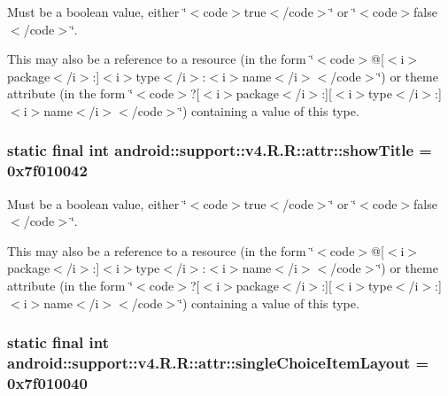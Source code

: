 Must be a boolean value, either \char`\"{}$<$code$>$true$<$/code$>$\char`\"{} or \char`\"{}$<$code$>$false$<$/code$>$\char`\"{}. 

This may also be a reference to a resource (in the form \char`\"{}$<$code$>$@\mbox{[}$<$i$>$package$<$/i$>$:\mbox{]}$<$i$>$type$<$/i$>$:$<$i$>$name$<$/i$>$$<$/code$>$\char`\"{}) or theme attribute (in the form \char`\"{}$<$code$>$?\mbox{[}$<$i$>$package$<$/i$>$:\mbox{]}\mbox{[}$<$i$>$type$<$/i$>$:\mbox{]}$<$i$>$name$<$/i$>$$<$/code$>$\char`\"{}) containing a value of this type. \hypertarget{classandroid_1_1support_1_1v4_1_1_r_1_1attr_45a7aaafeafd6863d28d4632bf06d843}{
\subsubsection[{showTitle}]{\setlength{\rightskip}{0pt plus 5cm}static final int android::support::v4.R.R::attr::showTitle = 0x7f010042}}
\label{classandroid_1_1support_1_1v4_1_1_r_1_1attr_45a7aaafeafd6863d28d4632bf06d843}


Must be a boolean value, either \char`\"{}$<$code$>$true$<$/code$>$\char`\"{} or \char`\"{}$<$code$>$false$<$/code$>$\char`\"{}. 

This may also be a reference to a resource (in the form \char`\"{}$<$code$>$@\mbox{[}$<$i$>$package$<$/i$>$:\mbox{]}$<$i$>$type$<$/i$>$:$<$i$>$name$<$/i$>$$<$/code$>$\char`\"{}) or theme attribute (in the form \char`\"{}$<$code$>$?\mbox{[}$<$i$>$package$<$/i$>$:\mbox{]}\mbox{[}$<$i$>$type$<$/i$>$:\mbox{]}$<$i$>$name$<$/i$>$$<$/code$>$\char`\"{}) containing a value of this type. \hypertarget{classandroid_1_1support_1_1v4_1_1_r_1_1attr_b631b6db9670ca8be8ff7746f872140e}{
\subsubsection[{singleChoiceItemLayout}]{\setlength{\rightskip}{0pt plus 5cm}static final int android::support::v4.R.R::attr::singleChoiceItemLayout = 0x7f010040}}
\label{classandroid_1_1support_1_1v4_1_1_r_1_1attr_b631b6db9670ca8be8ff7746f872140e}



